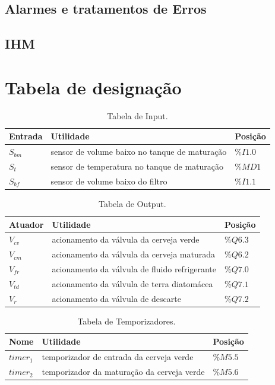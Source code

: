 \documentclass[12pt]{article}
\begin{document}
	
	\subsection{Alarmes e tratamentos de Erros}
	
	
	\subsection{IHM}

\section {Tabela de designação}
\begin{table}[H]
	\caption{Tabela de Input.}
	\centering
	\begin{tabular}{|  p{2cm} | p{10cm} | p{2cm} | }
		\hline
		Entrada & Utilidade & Posição\\
		\hline
		$S_{bm}$ & sensor de volume baixo no tanque de maturação & $\%I1.0$ \\
		$S_t$ & sensor de temperatura no tanque de maturação & $\%MD1$ \\
		$S_{bf}$ & sensor de volume baixo do filtro & $\%I1.1$ \\
		\hline
	\end{tabular}
\end{table}


\begin{table}[H]
	\caption{Tabela de Output.}
	\centering
	\begin{tabular}{|  p{2cm} | p{10cm} | p{2cm} | }
		\hline
		Atuador & Utilidade & Posição\\
		\hline
  		$V_{cv}$ & acionamento da válvula da cerveja verde & $\%Q6.3$ \\
  		$V_{cm}$ & acionamento da válvula da cerveja maturada & $\%Q6.2$ \\
 		$V_{fr}$ & acionamento da válvula de fluido refrigerante & $\%Q7.0$ \\
		$V_{td}$ & acionamento da válvula de terra diatomácea & $\%Q7.1$ \\
		$V_r$ & acionamento da válvula de descarte & $\%Q7.2$ \\
 		\hline
	\end{tabular}
\end{table}


\begin{table}[H]
	\caption{Tabela de Temporizadores.}
	\centering
	\begin{tabular}{|  p{2cm} | p{10cm} | p{2cm} | }
		\hline
		Nome & Utilidade & Posição\\
		\hline
		$timer_1$ &  temporizador de entrada da cerveja verde & $\%M5.5$ \\
		$timer_2$ & temporizador da maturação da cerveja verde & $\%M5.6$ \\
		 \hline
	\end{tabular}
\end{table}
\end{document}

